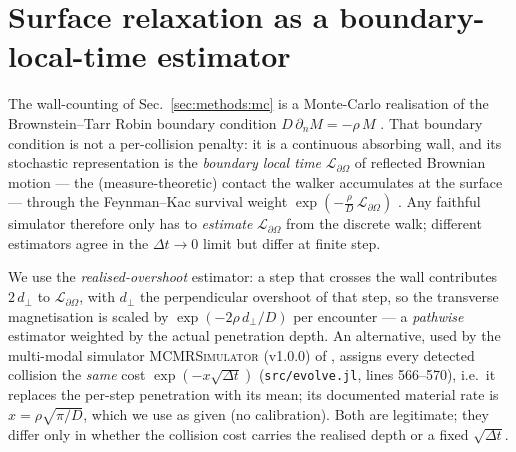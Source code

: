 \section{Surface relaxation as a boundary-local-time estimator}
\label{sec:app:estimator}

The wall-counting of Sec.~\ref{sec:methods:mc} is a Monte-Carlo realisation of the
Brownstein--Tarr Robin boundary condition $D\,\partial_n M = -\rho\,M$
\citep{Brownstein1979}. That boundary condition is not a per-collision penalty: it is a
continuous absorbing wall, and its stochastic representation is the \emph{boundary local
time} $\mathcal L_{\partial\Omega}$ of reflected Brownian motion --- the (measure-theoretic)
contact the walker accumulates at the surface --- through the Feynman--Kac survival weight
$\exp(-\tfrac{\rho}{D}\,\mathcal L_{\partial\Omega})$ \citep{Grebenkov2007}. Any faithful
simulator therefore only has to \emph{estimate} $\mathcal L_{\partial\Omega}$ from the discrete
walk; different estimators agree in the $\Delta t\!\to\!0$ limit but differ at finite step.

We use the \emph{realised-overshoot} estimator: a step that crosses the wall contributes
$2\,d_\perp$ to $\mathcal L_{\partial\Omega}$, with $d_\perp$ the perpendicular overshoot of
that step, so the transverse magnetisation is scaled by $\exp(-2\rho\,d_\perp/D)$ per
encounter --- a \emph{pathwise} estimator weighted by the actual penetration depth. An
alternative, used by the multi-modal simulator \textsc{MCMRSimulator} (v1.0.0) of
\citet{Cottaar2025}, assigns every detected collision the \emph{same} cost
$\exp(-x\sqrt{\Delta t})$ (\texttt{src/evolve.jl}, lines 566--570), i.e.\ it replaces the per-step
penetration with its mean; its documented material rate is $x=\rho\sqrt{\pi/D}$, which we use
as given (no calibration). Both are legitimate; they differ only in whether the collision cost
carries the realised depth or a fixed $\sqrt{\Delta t}$.

